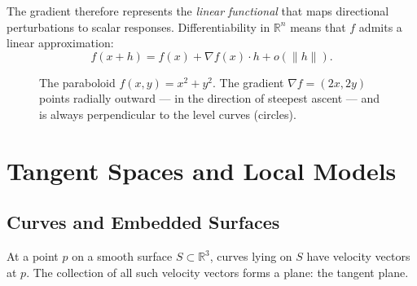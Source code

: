 \documentclass[12pt,openany]{book}
\newcommand{\R}{\mathbb{R}}
\begin{document}
The gradient therefore represents the \emph{linear functional} that maps
directional perturbations to scalar responses. Differentiability in
$\R^n$ means that $f$ admits a linear approximation:
\[
  f(x+h) = f(x) + \nabla f(x)\cdot h + o(\|h\|).
\]

\begin{figure}[H]
\centering
{}
\caption{The paraboloid $f(x,y)=x^2+y^2$. The gradient $\nabla f = (2x,2y)$
points radially outward — in the direction of steepest ascent — and is always
perpendicular to the level curves (circles).}
\label{fig:gradient}
\end{figure}

\chapter{Tangent Spaces and Local Models}
\label{ch:tangent}

\section{Curves and Embedded Surfaces}

At a point $p$ on a smooth surface $S\subset\R^3$, curves lying on $S$ have
velocity vectors at $p$. The collection of all such velocity vectors forms a
plane: the tangent plane.
\end{document}
